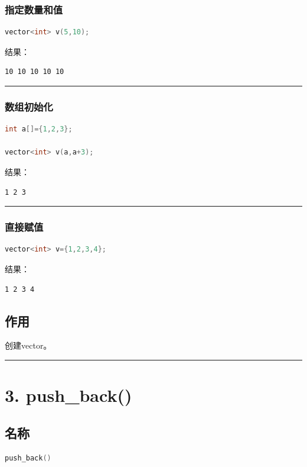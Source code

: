 \documentclass[9pt,twocolumn]{extarticle}
\begin{document}
\subsubsection{指定数量和值}
\begin{lstlisting}[language=C++]
vector<int> v(5,10);
\end{lstlisting}
结果：
\begin{lstlisting}
10 10 10 10 10
\end{lstlisting}

\noindent\rule{\linewidth}{0.4pt}

\subsubsection{数组初始化}
\begin{lstlisting}[language=C++]
int a[]={1,2,3};

vector<int> v(a,a+3);
\end{lstlisting}
结果：
\begin{lstlisting}
1 2 3
\end{lstlisting}

\noindent\rule{\linewidth}{0.4pt}

\subsubsection{直接赋值}
\begin{lstlisting}[language=C++]
vector<int> v={1,2,3,4};
\end{lstlisting}
结果：
\begin{lstlisting}
1 2 3 4
\end{lstlisting}

\subsection{作用}
创建vector。

\noindent\rule{\linewidth}{0.4pt}

\section{3. push\_back()}

\subsection{名称}
\begin{lstlisting}[language=C++]
push_back()
\end{lstlisting}
\end{document}
